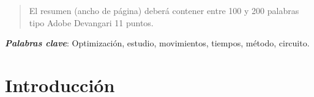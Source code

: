     \maketitle
    \thispagestyle{fancy}
    
    
    
    \begin{abstract}
    \noindent 
    El resumen (ancho de página) deberá contener entre 100 y 200 palabras tipo Adobe Devangari 11 puntos.
    
    \end{abstract}
    \textbf{\textit{Palabras clave}}: Optimización, estudio, movimientos, tiempos, método, circuito.
    
    \section{Introducción}
    
